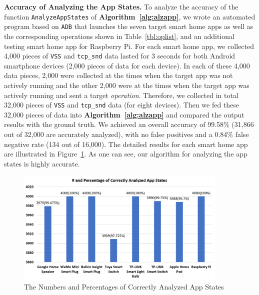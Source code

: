 \documentclass[letterpaper,12pt]{article}
\begin{document}
\textbf{Accuracy of Analyzing the App States.} 
To analyze the accuracy of the function \texttt{AnalyzeAppStates} of {\bf Algorithm~\ref{alg:alzapp}}, we wrote an automated program based on \texttt{ADB} that launches the seven target smart home apps as well as the corresponding operations shown in Table~\ref{tbl:oplist}, and an additional testing smart home app for Raspberry Pi. For each smart home app, we collected 4,000 pieces of \texttt{VSS} and \texttt{tcp\_snd} data lasted for 3 seconds for both Android smartphone devices (2,000 pieces of data for each device). In each of these 4,000 data pieces, 2,000 were collected at the times when the target app was not actively running and the other 2,000 were at the times when the target app was actively running and sent a target \textit{operation}. Therefore, we collected in total 32,000 pieces of \texttt{VSS} and \texttt{tcp\_snd} data (for eight devices). Then we fed these 32,000 pieces of data into  {\bf Algorithm~\ref{alg:alzapp}} and compared the output results with the ground truth. We achieved an overall accuracy of 99.58\% (31,866 out of 32,000 are accurately analyzed), with no false positives and a 0.84\% false negative rate (134 out of 16,000). The detailed results for each smart home app are illustrated in Figure~\ref{fig:appstate}. As one can see, our algorithm for analyzing the app states is highly accurate.

\begin{figure}[!htb]
        \centering
        \includegraphics[width=0.9\textwidth]{appstate.png}
        \caption{The Numbers and Percentages of Correctly Analyzed App States}
        \label{fig:appstate}
\end{figure}
\end{document}
